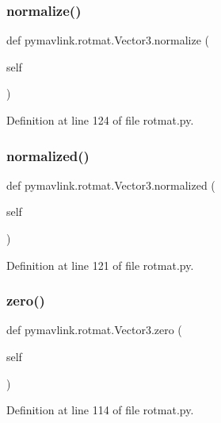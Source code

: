 \subsubsection{\texorpdfstring{normalize()}{normalize()}}
{\footnotesize\ttfamily def pymavlink.\+rotmat.\+Vector3.\+normalize (\begin{DoxyParamCaption}\item[{}]{self }\end{DoxyParamCaption})}



Definition at line 124 of file rotmat.\+py.

\mbox{\label{classpymavlink_1_1rotmat_1_1Vector3_aca80b86ab5912de572c2472d1ab59705}} 
\subsubsection{\texorpdfstring{normalized()}{normalized()}}
{\footnotesize\ttfamily def pymavlink.\+rotmat.\+Vector3.\+normalized (\begin{DoxyParamCaption}\item[{}]{self }\end{DoxyParamCaption})}



Definition at line 121 of file rotmat.\+py.

\mbox{\label{classpymavlink_1_1rotmat_1_1Vector3_aa22093b2e0909ab64ef2f22ac305412e}} 
\subsubsection{\texorpdfstring{zero()}{zero()}}
{\footnotesize\ttfamily def pymavlink.\+rotmat.\+Vector3.\+zero (\begin{DoxyParamCaption}\item[{}]{self }\end{DoxyParamCaption})}



Definition at line 114 of file rotmat.\+py.



